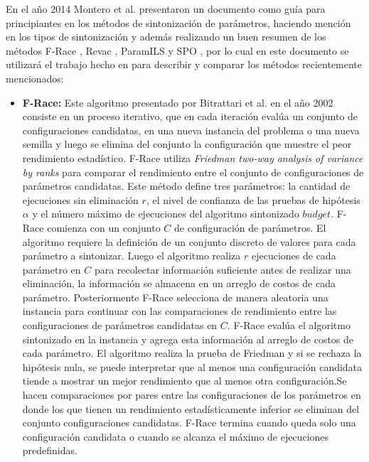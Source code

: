 \documentclass[letter, 10pt]{article}
\begin{document}
\begin{multicols}{2}
En el año 2014 Montero et al. \cite{Montero2014ABG} presentaron un documento como guía para principiantes en los métodos de sintonización de parámetros, haciendo mención en los tipos de sintonización y además realizando un buen resumen de los métodos F-Race \cite{Birattari2002ARA}, Revac \cite{Nannen2007RelevanceEA}, ParamILS \cite{Hutter2007AutomaticAC} y SPO \cite{BartzBeielstein2005SequentialPO}, por lo cual en este documento se utilizará el trabajo hecho en \cite{Montero2014ABG} para describir y comparar los métodos recientemente mencionados:
\begin{itemize}
    \item \textbf{F-Race:} 
    Este algoritmo presentado por Bitrattari et al.\cite{Birattari2002ARA} en el año 2002 consiste en un proceso iterativo, que en cada iteración evalúa un conjunto de configuraciones candidatas, en una nueva instancia del problema o una nueva semilla y luego se elimina del conjunto la configuración que muestre el peor rendimiento estadístico. F-Race utiliza \textit{Friedman two-way analysis of variance by ranks} para comparar el rendimiento entre el conjunto de configuraciones de parámetros candidatas. Este método define tres parámetros: la cantidad de ejecuciones sin eliminación $r$, el nivel de confianza de las pruebas de hipótesis $\alpha$ y el número máximo de ejecuciones del algoritmo sintonizado $budget$. F-Race comienza con un conjunto $C$ de configuración de parámetros. El algoritmo requiere la definición de un conjunto discreto de valores para cada parámetro a sintonizar. Luego el algoritmo realiza $r$ ejecuciones de cada parámetro en $C$ para recolectar información suficiente antes de realizar una eliminación, la información se almacena en un arreglo de costos de cada parámetro. Posteriormente F-Race selecciona de manera aleatoria una instancia para continuar con las comparaciones de rendimiento entre las configuraciones de parámetros candidatas en $C$. F-Race evalúa el algoritmo sintonizado en la instancia y agrega esta información al arreglo de costos de cada parámetro. El algoritmo realiza la prueba de Friedman y si se rechaza la hipótesis nula, se puede interpretar que al menos una configuración candidata tiende a mostrar un mejor rendimiento que al menos otra configuración.Se hacen comparaciones por pares entre las configuraciones de los parámetros en donde los que tienen un rendimiento estadísticamente inferior se eliminan del conjunto configuraciones candidatas. F-Race termina cuando queda solo una configuración candidata o cuando se alcanza el máximo de ejecuciones predefinidas. 

\end{itemize}
\end{multicols}
\end{document}
